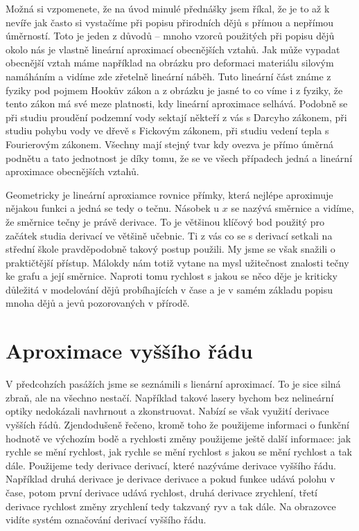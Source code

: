 \documentclass[12pt]{article}
\begin{document}
Možná si vzpomenete, že na úvod minulé přednášky jsem říkal, že je to až k nevíře jak často si vystačíme při popisu přirodních dějů s přímou a nepřímou úměrností. Toto je jeden z důvodů -- mnoho vzorců použitých při popisu dějů okolo nás je vlastně lineární aproximací obecnějších vztahů. Jak může vypadat obecnější vztah máme například na obrázku pro deformaci materiálu silovým namáháním a vidíme zde zřetelně lineární náběh. Tuto lineární část známe z fyziky pod pojmem Hookův zákon a z obrázku je jasné to co víme i z fyziky, že tento zákon má své meze platnosti, kdy lineární aproximace selhává. Podobně se při studiu proudění podzemní vody sektají někteří z vás s Darcyho zákonem, při studiu pohybu vody ve dřevě s Fickovým zákonem, při studiu vedení tepla s Fourierovým zákonem. Všechny mají stejný tvar kdy ovezva je přímo úměrná podnětu a tato jednotnost je díky tomu, že se ve všech případech jedná a lineární aproximace obecnějších vztahů.

Geometricky je lineární aproxiamce rovnice přímky, která nejlépe aproximuje nějakou funkci a jedná se tedy o tečnu. Násobek u $x$ se nazývá směrnice a vidíme, že směrnice tečny je právě derivace. To je většinou klíčový bod použitý pro začátek studia derivací ve většině učebnic. Ti z vás co se s derivací setkali na střední škole pravděpodobně takový postup použili. My jsme se však snažili o praktičtější přístup. Málokdy nám totiž vytane na mysl užitečnost znalosti tečny ke grafu a její směrnice. Naproti tomu rychlost s jakou se něco děje je kriticky důležitá v modelování dějů probíhajících v čase a je v samém základu popisu mnoha dějů a jevů pozorovaných v přírodě.

\section*{Aproximace vyššího řádu}

V předcohzích pasážích jsme se seznámili s lienární aproximací. To je sice silná zbraň, ale na všechno nestačí. Například takové lasery bychom bez nelineární optiky nedokázali navhrnout a zkonstruovat. Nabízí se však využití derivace vyšších řádů. Zjendodušeně řečeno, kromě toho že použijeme informaci o funkční hodnotě ve výchozím bodě a rychlosti změny použijeme ještě další informace: jak rychle se mění rychlost, jak rychle se mění rychlost s jakou se mění rychlost a tak dále. Použijeme tedy derivace derivací, které nazýváme derivace vyššího řádu. Například druhá derivace je derivace derivace a pokud funkce udává polohu v čase, potom první derivace udává rychlost, druhá derivace zrychlení, třetí derivace rychlost změny zrychlení tedy takzvaný ryv a tak dále. Na obrazovce vidíte systém označování derivací vyššího řádu.
\end{document}
